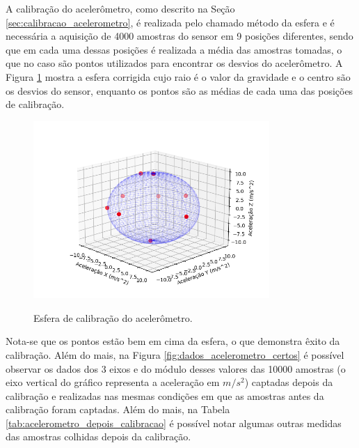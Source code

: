 \documentclass[acronym, symbols, table, deposito]{fei}
\begin{document}
	A calibração do acelerômetro, como descrito na Seção \ref{sec:calibracao_acelerometro}, é realizada pelo chamado método da esfera e é necessária a aquisição de 4000 amostras do sensor em 9 posições diferentes, sendo que em cada uma dessas posições é realizada a média das amostras tomadas, o que no caso são pontos utilizados para encontrar os desvios do acelerômetro. A Figura \ref{fig:dados_esfera_certo} mostra a esfera corrigida cujo raio é o valor da gravidade e o centro são os desvios do sensor, enquanto os pontos são as médias de cada uma das posições de calibração.
	
	\begin{figure}[!htb]
		\centering
		\caption{Esfera de calibração do acelerômetro.}
		\includegraphics[width=0.8\textwidth]{dados_esfera_correto.png}
		\label{fig:dados_esfera_certo}
	\end{figure}
	
	Nota-se que os pontos estão bem em cima da esfera, o que demonstra êxito da calibração. Além do mais, na Figura \ref{fig:dados_acelerometro_certos} é possível observar os dados dos 3 eixos e do módulo desses valores das 10000 amostras (o eixo vertical do gráfico representa a aceleração em $m/s^2$) captadas depois da calibração e realizadas nas mesmas condições em que as amostras antes da calibração foram captadas. Além do mais, na Tabela \ref{tab:acelerometro_depois_calibracao} é possível notar algumas outras medidas das amostras colhidas depois da calibração.
	
\end{document}
